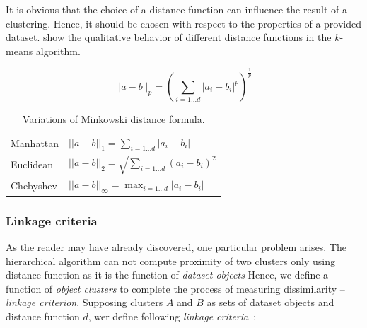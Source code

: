 It is obvious that the choice of a distance function can influence the result of a clustering. Hence, it should be chosen with respect to the properties of a provided dataset. \citet{aggarwal2001surprising} show the qualitative behavior of different distance functions in the $k$-means algorithm.  

\begin{equation}\label{eq01:mink}
||a-b||_p = (\sum_{i=1...d}|a_i-b_i|^p)^{\frac{1}{p}}
\end{equation}

\begin{table}
	\centering
	\begin{tabular}{ll}
		\toprule
		Manhattan & $||a-b||_1 = \sum_{i=1...d}|a_i-b_i|$          \\
		Euclidean & $||a-b||_2 = \sqrt{\sum_{i=1...d}(a_i-b_i)^2}$ \\
		Chebyshev & $||a-b||_\infty = \max_{i=1\dots d}|a_i-b_i|$  \\ \bottomrule
	\end{tabular}
	\caption{Variations of Minkowski distance formula.}
	\label{tab01:mink}
\end{table}

\subsubsection{Linkage criteria}

As the reader may have already discovered, one particular problem arises. The hierarchical algorithm can not compute proximity of two clusters only using distance function as it is the function of \emph{dataset objects} Hence, we define a function of \emph{object clusters} to complete the process of measuring dissimilarity -- \emph{linkage criterion}. Supposing clusters $A$ and $B$ as sets of dataset objects and distance function $d$, wer define following \emph{linkage criteria}~\cite{yim2015hierarchical}:

